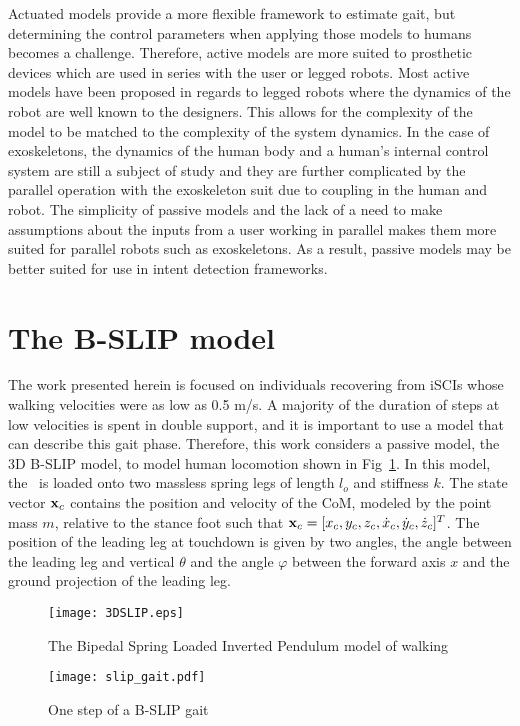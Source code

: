 Actuated models provide a more flexible framework to estimate gait, but determining the control parameters when applying those models to humans becomes a challenge. Therefore, active models are more suited to prosthetic devices which are used in series with the user or legged robots. Most active models have been proposed in regards to legged robots where the dynamics of the robot are well known to the designers. This allows for the complexity of the model to be matched to the complexity of the system dynamics. In the case of exoskeletons, the dynamics of the human body and a human's internal control system \cite{wolpert1998internal, dounskaia2005internal, kording2007decision} are still a subject of study and they are further complicated by the parallel operation with the exoskeleton suit due to coupling in the human and robot. The simplicity of passive models and the lack of a need to make assumptions about the inputs from a user working in parallel makes them more suited for parallel robots such as exoskeletons. As a result, passive models may be better suited for use in intent detection frameworks. 

\section{The B-SLIP model}\label{sec:bslip_model}
The work presented herein is focused on individuals recovering from iSCIs whose walking velocities were as low as 0.5 m/s. A majority of the duration of steps at low velocities is spent in double support, and it is important to use a model that can describe this gait phase. Therefore, this work considers a passive model, the 3D B-SLIP model, to model human locomotion shown in Fig~\ref{fig:slip}. In this model, the \COM~is loaded onto two massless spring legs of length $ l_o $ and stiffness $ k $. The state vector $ \mathbf{x}_{c} $ contains the position and velocity of the CoM, modeled by the point mass $ m $, relative to the stance foot such that $ \mathbf{x}_{c} = [x_{c} ,y_{c} ,z_{c} ,\dot{x}_{c} ,\dot{y}_{c} ,\dot{z}_{c}]^T $. The position of the leading leg at touchdown is given by two angles, the angle between the leading leg and vertical $ \theta $ and the angle $ \varphi $ between the forward axis $ x $  and the ground projection of the leading leg.
%
\begin{figure}
	\centering
	\texttt{[image: 3DSLIP.eps]}
	\caption[The Bipedal Spring Loaded Inverted Pendulum]{The Bipedal Spring Loaded Inverted Pendulum \cite{liu2015dynamic} model of walking}\label{fig:slip}
\end{figure}
%
\begin{figure}
	\centering
	\texttt{[image: slip\_gait.pdf]}
	\caption{One step of a B-SLIP gait}\label{fig:slip_gait}
\end{figure} 
%


